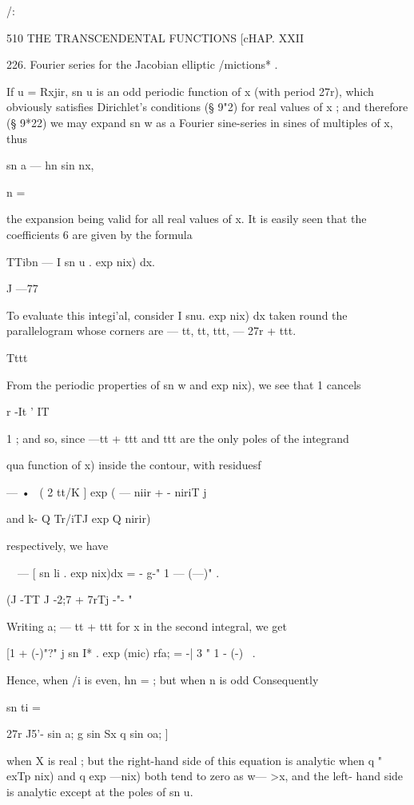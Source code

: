/:



510 THE TRANSCENDENTAL FUNCTIONS [cHAP. XXII

226. Fourier series for the Jacobian elliptic /mictions* .

If u = Rxjir, sn u is an odd periodic function of x (with period 27r),
which obviously satisfies Dirichlet's conditions (§ 9"2) for real
values of x ; and therefore (§ 9*22) we may expand sn w as a Fourier
sine-series in sines of multiples of x, thus

sn a — hn sin nx,

n = \

the expansion being valid for all real values of x. It is easily seen
that the coefficients 6 are given by the formula



TTibn — I sn u . exp nix) dx.

J —77

To evaluate this integi'al, consider I snu. exp nix) dx taken round
the parallelogram whose corners are — tt, tt, ttt, — 27r + ttt.

Tttt

From the periodic properties of sn w and exp nix), we see that 1
cancels

r -It ' IT

1 ; and so, since —tt + ttt and ttt are the only poles of the
integrand

 qua function of x) inside the contour, with residuesf

— •~ ( 2 tt/K ] exp ( — niir + - niriT j

and k- Q Tr/iTJ exp Q nirir)

respectively, we have

\ \ — [ sn li . exp nix)dx = - g-" 1 — (—)" .

(J -TT J -2;7 + 7rTj -"- "

Writing a; — tt + ttt for x in the second integral, we get

[1 + (-)"?" j sn I* . exp (mic) rfa; = -| 3 " 1 - (-)~ .



Hence, when /i is even, hn = ; but when n is odd Consequently






sn ti =



27r J5'- sin a; g sin Sx q sin oa; ]



when X is real ; but the right-hand side of this equation is analytic
when q " exTp nix) and q exp —nix) both tend to zero as w— >x, and the
left- hand side is analytic except at the poles of sn u.

